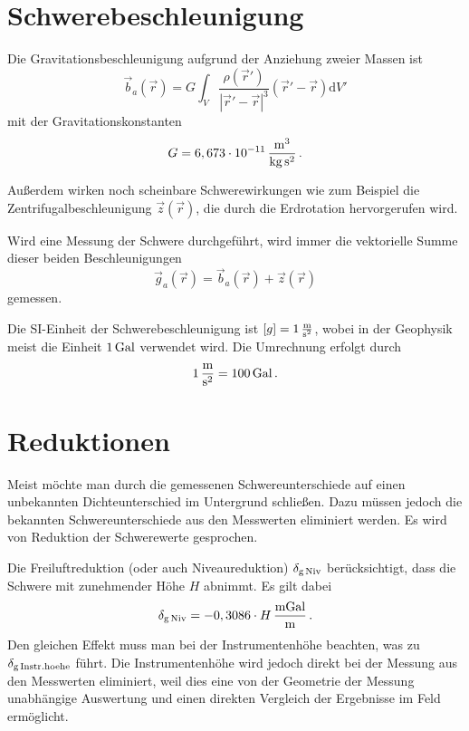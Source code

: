 \section{Schwerebeschleunigung}

Die Gravitationsbeschleunigung aufgrund der Anziehung zweier Massen ist
\begin{equation}
 \vec{b}_a(\vec{r})=G\int_V \frac{\rho(\vec{r}')}{|\vec{r}'-\vec{r}|^3}(\vec{r}'-\vec{r})\text{d}V'
\end{equation}
mit der Gravitationskonstanten
\begin{equation}
 G=6,673\cdot 10^{-11}\,\frac{\mathrm{m^3}}{\mathrm{kg\,s^2}} \text{\,.}
\end{equation}

Außerdem wirken noch scheinbare Schwerewirkungen wie zum Beispiel die Zentrifugalbeschleunigung $\vec{z}(\vec{r})$, die durch die Erdrotation hervorgerufen wird.

Wird eine Messung der Schwere durchgeführt, wird immer die vektorielle Summe dieser beiden Beschleunigungen
\begin{equation}
 \vec{g}_a(\vec{r})=\vec{b}_a(\vec{r})+\vec{z}(\vec{r})
\end{equation}
gemessen.

Die SI-Einheit der Schwerebeschleunigung ist $\left[g\right]=1\,\frac{\mathrm{m}}{\mathrm{s^2}}$, wobei in der Geophysik meist die Einheit $1\,\mathrm{Gal}$ verwendet wird. Die Umrechnung erfolgt durch
\begin{equation}
 1\,\frac{\mathrm{m}}{\mathrm{s^2}}=100\,\mathrm{Gal} \text{\,.}
\end{equation}

\section{Reduktionen}
\label{sec:Reduktionen}

Meist möchte man durch die gemessenen Schwereunterschiede auf einen unbekannten Dichteunterschied im Untergrund schließen. Dazu müssen jedoch die bekannten Schwereunterschiede aus den Messwerten eliminiert werden. Es wird von Reduktion der Schwerewerte gesprochen.

Die Freiluftreduktion (oder auch Niveaureduktion) $\delta_{\mathrm{g\,Niv}}$ berücksichtigt, dass die Schwere mit zunehmender Höhe $H$ abnimmt. Es gilt dabei
\begin{equation}
 \delta_{\mathrm{g\,Niv}}=-0,3086\cdot H\,\frac{\mathrm{mGal}}{\mathrm{m}} \text{\,.}
 \label{eq:Freiluft}
\end{equation}
Den gleichen Effekt muss man bei der Instrumentenhöhe beachten, was zu $\delta_{\mathrm{g\,Instr.hoehe}}$ führt. Die Instrumentenhöhe wird jedoch direkt bei der Messung aus den Messwerten eliminiert, weil dies eine von der Geometrie der Messung unabhängige Auswertung und einen direkten Vergleich der Ergebnisse im Feld ermöglicht.

